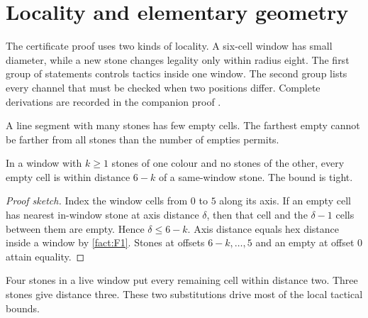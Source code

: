 \section{Locality and elementary geometry}
\label{sec:geometry}

The certificate proof uses two kinds of locality.  A six-cell window has
small diameter, while a new stone changes legality only within radius eight.
The first group of statements controls tactics inside one window.  The second
group lists every channel that must be checked when two positions differ.
Complete derivations are recorded in the companion proof
\cite{hexobot-companions}.

A line segment with many stones has few empty cells.  The farthest empty
cannot be farther from all stones than the number of empties permits.

\begin{lemma}
\label{lem:L1}
In a window with $k\ge1$ stones of one colour and no stones of the other,
every empty cell is within distance $6-k$ of a same-window stone.  The bound
is tight.
\end{lemma}

\begin{proof}[Proof sketch]
Index the window cells from $0$ to $5$ along its axis.  If an empty cell has
nearest in-window stone at axis distance $\delta$, then that cell and the
$\delta-1$ cells between them are empty.  Hence $\delta\le6-k$.  Axis distance
equals hex distance inside a window by \cref{fact:F1}.  Stones at offsets
$6-k,\ldots,5$ and an empty at offset $0$ attain equality.
\end{proof}

\begin{plainterms}
Four stones in a live window put every remaining cell within distance two.
Three stones give distance three.  These two substitutions drive most of the
local tactical bounds.
\end{plainterms}

